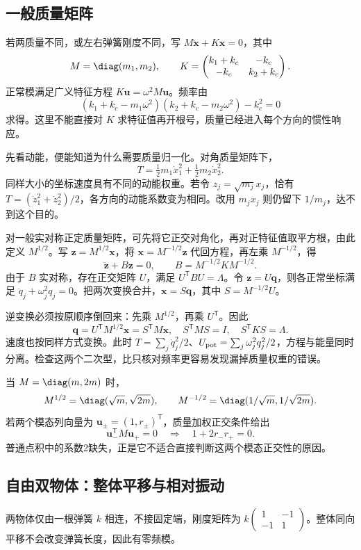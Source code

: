 \documentclass[11pt,openany,fontset=fandol]{ctexbook}
\theoremstyle{plain}\newtheorem{theorem}{定理}[chapter]\newtheorem{proposition}[theorem]{命题}
\theoremstyle{definition}\newtheorem{definition}{定义}[chapter]\newtheorem{example}{例}[chapter]
\theoremstyle{remark}\newtheorem*{remark}{说明}
\newcommand{\vct}[1]{\bm{#1}}\newcommand{\Rea}{\operatorname{Re}}\newcommand{\Ima}{\operatorname{Im}}
\begin{document}
\subsection{一般质量矩阵}
若两质量不同，或左右弹簧刚度不同，写 $M\ddot{\vct x}+K\vct x=0$，其中
\[
M=\diag(m_1,m_2),\qquad
K=\begin{pmatrix}k_1+k_c&-k_c\\-k_c&k_2+k_c\end{pmatrix}.
\]
正常模满足广义特征方程 $K\vct u=\omega^2M\vct u$。频率由
\begin{equation}
(k_1+k_c-m_1\omega^2)(k_2+k_c-m_2\omega^2)-k_c^2=0
\end{equation}
求得。这里不能直接对 $K$ 求特征值再开根号，质量已经进入每个方向的惯性响应。

先看动能，便能知道为什么需要质量归一化。对角质量矩阵下，
\[
T=\tfrac12m_1\dot x_1^2+\tfrac12m_2\dot x_2^2.
\]
同样大小的坐标速度具有不同的动能权重。若令 $z_j=\sqrt{m_j}x_j$，恰有 $T=(\dot z_1^2+\dot z_2^2)/2$，各方向的动能系数变为相同。改用 $m_jx_j$ 则仍留下 $1/m_j$，达不到这个目的。

对一般实对称正定质量矩阵，可先将它正交对角化，再对正特征值取平方根，由此定义 $M^{1/2}$。写 $\vct z=M^{1/2}\vct x$，将 $\vct x=M^{-1/2}\vct z$ 代回方程，再左乘 $M^{-1/2}$，得
\[
\ddot{\vct z}+B\vct z=0,\qquad B=M^{-1/2}KM^{-1/2}.
\]
由于 $B$ 实对称，存在正交矩阵 $U$，满足 $U^{\mathsf T}BU=\Lambda$。令 $\vct z=U\vct q$，则各正常坐标满足 $\ddot q_j+\omega_j^2q_j=0$。把两次变换合并，$\vct x=S\vct q$，其中 $S=M^{-1/2}U$。

逆变换必须按原顺序倒回来：先乘 $M^{1/2}$，再乘 $U^{\mathsf T}$。因此
\[
\vct q=U^{\mathsf T}M^{1/2}\vct x=S^{\mathsf T}M\vct x,
\quad S^{\mathsf T}MS=I,\quad S^{\mathsf T}KS=\Lambda.
\]
速度也按同样方式变换。此时 $T=\sum_j\dot q_j^2/2$、$U_{\rm pot}=\sum_j\omega_j^2q_j^2/2$，方程与能量同时分离。检查这两个二次型，比只核对频率更容易发现漏掉质量权重的错误。

当 $M=\diag(m,2m)$ 时，
\[
M^{1/2}=\diag(\sqrt m,\sqrt{2m}),\qquad
M^{-1/2}=\diag(1/\sqrt m,1/\sqrt{2m}).
\]
若两个模态列向量为 $\vct u_\pm=(1,r_\pm)^{\mathsf T}$，质量加权正交条件给出
\[
\vct u_-^{\mathsf T}M\vct u_+=0\quad\Longrightarrow\quad1+2r_-r_+=0.
\]
普通点积中的系数2缺失，正是它不适合直接判断这两个模态正交性的原因。

\subsection{自由双物体：整体平移与相对振动}
两物体仅由一根弹簧 $k$ 相连，不接固定端，刚度矩阵为 $k\begin{pmatrix}1&-1\\-1&1\end{pmatrix}$。整体同向平移不会改变弹簧长度，因此有零频模。
\end{document}
